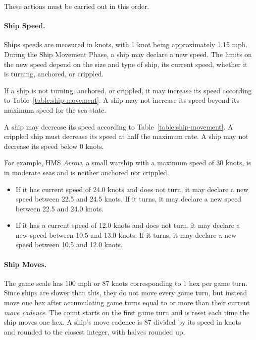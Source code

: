 {\begin{enumerate}
\end{enumerate}
These actions must be carried out in this order.



\paragraph{Ship Speed.} 

Ships speeds are measured in knots, with 1 knot being approximately 1.15 mph. During the Ship Movement Phase, a ship may declare a new speed. The limits on the new speed depend on the size and type of ship, its current speed, whether it is turning, anchored, or crippled.

If a ship is not turning, anchored, or crippled, it may increase its speed according to Table~\ref{table:ship-movement}. A ship may not increase its speed beyond its maximum speed for the sea state. 

A ship may decrease its speed according to Table~\ref{table:ship-movement}. A crippled ship must decrease its speed at half the maximum rate. A ship may not decrease its speed below 0 knots.

For example, HMS {\itshape Arrow}, a small warship with a maximum speed of 30 knots, is in moderate seas and is neither anchored nor crippled.
\begin{itemize}

    \item If it has current speed of 24.0 knots and does not turn, it may declare a new speed between 22.5 and 24.5 knots. If it turns, it may declare a new speed between 22.5 and 24.0 knots.

    \item If it has a current speed of 12.0 knots and does not turn, it may declare a new speed between 10.5 and 13.0 knots. If it turns, it may declare a new speed between 10.5 and 12.0 knots.

\end{itemize}

\paragraph{Ship Moves.}

The game scale has 100 mph or 87 knots corresponding to 1 hex per game turn. Since ships are slower than this, they do not move every game turn, but instead move one hex after accumulating game turns equal to or more than their current \emph{move cadence}. The count starts on the first game turn and is reset each time the ship moves one hex. A ship's move cadence is 87 divided by its speed in knots and rounded to the closest integer, with halves rounded up. 

}
